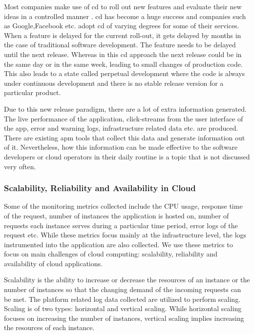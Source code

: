 \documentclass[article,type=msc,colorback,12pt,accentcolor=tud8b,table]{tudthesis}
\begin{document}
		Most companies make use of \gls{cd} to roll out new features and evaluate their new ideas in a controlled manner \cite{kohavi2007practical}. \gls{cd} has become a huge success and companies such as Google,Facebook etc. adopt \gls{cd} of varying degrees for some of their services. When a feature is delayed for the current roll-out, it gets delayed by months in the case of traditional software development. The feature needs to be delayed until the next release. Whereas in this \gls{cd} approach the next release could be in the same day or in the same week, leading to small changes of production code. This also leads to a state called perpetual development where the code is always under continuous development and there is no stable release version for a particular product.  	\par Due to this new release paradigm, there are a lot of extra information generated. The live performance of the application, click-streams from the user interface of the app, error and warning logs, infrastructure related data etc. are produced. There are existing \gls{apm} tools that collect this data and generate information out of it. Nevertheless, how this information can be made effective to the software developers or cloud operators in their daily routine is a topic that is not discussed very often. 
		
		\subsubsection{Scalability, Reliability  and Availability in Cloud}
		
		Some of the monitoring metrics collected include the CPU usage, response time of the request, number of instances the application is hosted on, number of requests each instance serves during a particular time period, error logs of the request etc. While these metrics focus mainly at the infrastructure level, the logs instrumented into the application are also collected. We use these metrics to focus on main challenges of cloud computing: scalability, reliability and availability of cloud applications.
		
		Scalability is the ability to increase or decrease the resources of an instance or the number of instances so that the changing demand of the incoming requests can be met. The platform related log data collected are utilized to perform scaling. Scaling is of two types: horizontal and vertical scaling. While horizontal scaling focuses on increasing the number of instances, vertical scaling implies increasing the resources of each instance.
		
\end{document}
